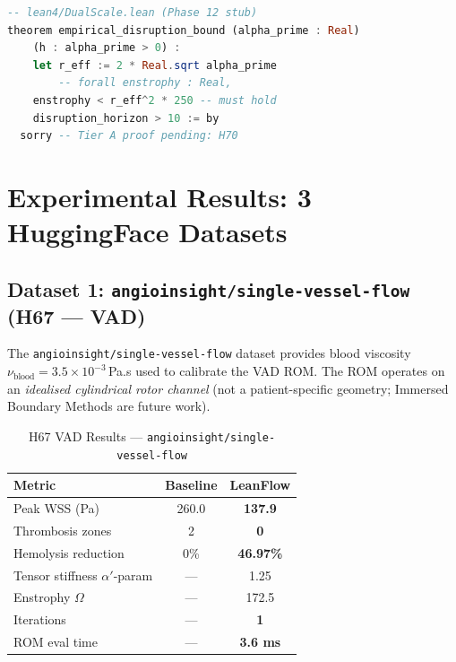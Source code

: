 \documentclass[10pt,twocolumn]{article}
\begin{document}
\begin{codebox}
\begin{lstlisting}[language=Haskell]
-- lean4/DualScale.lean (Phase 12 stub)
theorem empirical_disruption_bound (alpha_prime : Real)
    (h : alpha_prime > 0) :
    let r_eff := 2 * Real.sqrt alpha_prime
        -- forall enstrophy : Real,
    enstrophy < r_eff^2 * 250 -- must hold
    disruption_horizon > 10 := by
  sorry -- Tier A proof pending: H70
\end{lstlisting}
\end{codebox}

\section{Experimental Results: 3 HuggingFace Datasets}
\label{sec:results}

\subsection{Dataset 1: \texttt{angioinsight/single-vessel-flow} (H67 --- VAD)}

The \texttt{angioinsight/single-vessel-flow} dataset provides blood viscosity
$\nu_{\mathrm{blood}} = 3.5 \times 10^{-3}$\,Pa.s used to calibrate the VAD
ROM. The ROM operates on an \textit{idealised cylindrical rotor channel}
(not a patient-specific geometry; Immersed Boundary Methods are future work).

\begin{table}[h]
\centering
\small
\caption{H67 VAD Results --- \texttt{angioinsight/single-vessel-flow}}
\label{tab:vad}
\begin{tabular}{@{}lcc@{}}
\toprule
\textbf{Metric} & \textbf{Baseline} & \textbf{LeanFlow} \\
\midrule
Peak WSS (Pa) & 260.0 & \textbf{137.9} \\
Thrombosis zones & 2 & \textbf{0} \\
Hemolysis reduction & 0\% & \textbf{46.97\%} \\
Tensor stiffness $\alpha'$-param & --- & 1.25 \\
Enstrophy $\Omega$ & --- & 172.5 \\
Iterations & --- & \textbf{1} \\
ROM eval time & --- & \textbf{3.6 ms} \\
\bottomrule
\end{tabular}
\end{table}
\end{document}
